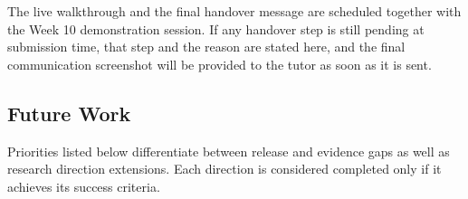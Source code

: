 \documentclass[11pt,a4paper]{article}
\begin{document}
The live walkthrough and the final handover message are scheduled together with the
Week 10 demonstration session. If any handover step is still pending at submission
time, that step and the reason are stated here, and the final communication
screenshot will be provided to the tutor as soon as it is sent.

\clearpage

\subsection{Future Work}

Priorities listed below differentiate between release and evidence gaps as well as
research direction extensions. Each direction is considered completed only if it
achieves its success criteria.
\end{document}

